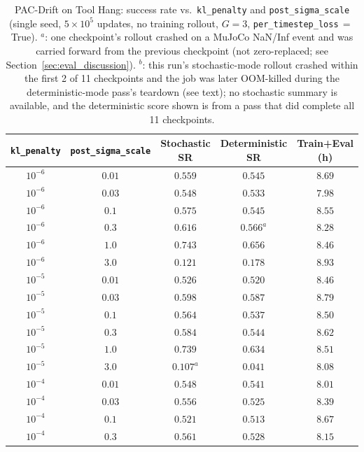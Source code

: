 \documentclass[11pt]{article}
\begin{document}
\begin{table}[H]
\centering
\caption{PAC-Drift on Tool Hang: success rate vs.\ \texttt{kl\_penalty} and
\texttt{post\_sigma\_scale} (single seed, $5\times10^5$ updates, no training
rollout, $G=3$, \texttt{per\_timestep\_loss}\,$=$\,True). $^{a}$: one
checkpoint's rollout crashed on a MuJoCo NaN/Inf event and was carried
forward from the previous checkpoint (not zero-replaced; see
Section~\ref{sec:eval_discussion}). $^{b}$: this run's stochastic-mode
rollout crashed within the first 2 of 11 checkpoints and the job was later
OOM-killed during the deterministic-mode pass's teardown (see text); no
stochastic summary is available, and the deterministic score shown is from
a pass that did complete all 11 checkpoints.}
\label{tab:pac_drift_sweep}
\begin{tabular}{ccccc}
\toprule
\texttt{kl\_penalty} & \texttt{post\_sigma\_scale} & Stochastic SR & Deterministic SR & Train+Eval (h) \\
\midrule
$10^{-6}$ & $0.01$ & $0.559$       & $0.545$       & $8.69$ \\
$10^{-6}$ & $0.03$ & $0.548$       & $0.533$       & $7.98$ \\
$10^{-6}$ & $0.1$  & $0.575$       & $0.545$       & $8.55$ \\
$10^{-6}$ & $0.3$  & $0.616$       & $0.566^{a}$   & $8.28$ \\
$10^{-6}$ & $1.0$  & $\mathbf{0.743}$ & $\mathbf{0.656}$ & $8.46$ \\
$10^{-6}$ & $3.0$  & $0.121$       & $0.178$       & $8.93$ \\
\midrule
$10^{-5}$ & $0.01$ & $0.526$       & $0.520$       & $8.46$ \\
$10^{-5}$ & $0.03$ & $0.598$       & $0.587$       & $8.79$ \\
$10^{-5}$ & $0.1$  & $0.564$       & $0.537$       & $8.50$ \\
$10^{-5}$ & $0.3$  & $0.584$       & $0.544$       & $8.62$ \\
$10^{-5}$ & $1.0$  & $\mathbf{0.739}$ & $\mathbf{0.634}$ & $8.51$ \\
$10^{-5}$ & $3.0$  & $0.107^{a}$   & $0.041$       & $8.08$ \\
\midrule
$10^{-4}$ & $0.01$ & $0.548$       & $0.541$       & $8.01$ \\
$10^{-4}$ & $0.03$ & $0.556$       & $0.525$       & $8.39$ \\
$10^{-4}$ & $0.1$  & $0.521$       & $0.513$       & $8.67$ \\
$10^{-4}$ & $0.3$  & $0.561$       & $0.528$       & $8.15$ \\

\end{tabular}
\end{table}
\end{document}
